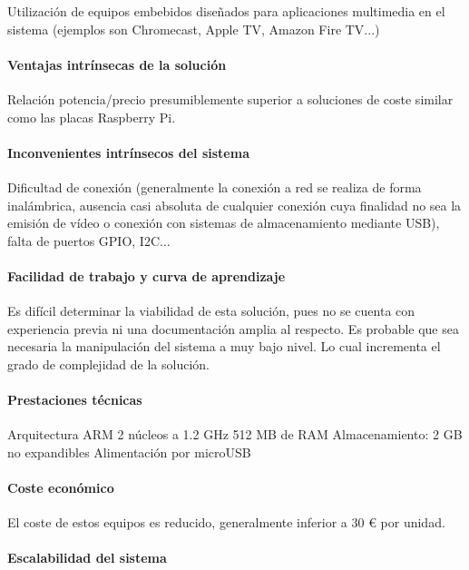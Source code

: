 Utilización de equipos embebidos diseñados para aplicaciones multimedia en el sistema (ejemplos son Chromecast, Apple TV, Amazon Fire TV...)

\paragraph{Ventajas intrínsecas de la solución}

Relación potencia/precio presumiblemente superior a soluciones de coste similar como las placas Raspberry Pi.

\paragraph{Inconvenientes intrínsecos del sistema}

Dificultad de conexión (generalmente la conexión a red se realiza de forma inalámbrica, ausencia casi absoluta de cualquier conexión cuya finalidad no sea la emisión de vídeo o conexión con sistemas de almacenamiento mediante USB), falta de puertos GPIO, I2C...

\paragraph{Facilidad de trabajo y curva de aprendizaje}
Es difícil determinar la viabilidad de esta solución, pues no se cuenta con experiencia previa ni una documentación amplia al respecto.
Es probable que sea necesaria la manipulación del sistema a muy bajo nivel. Lo cual incrementa el grado de complejidad de la solución.

\paragraph{Prestaciones técnicas}
Arquitectura ARM
2 núcleos a 1.2 GHz
512 MB de RAM
Almacenamiento: 2 GB no expandibles
Alimentación por microUSB

\paragraph{Coste económico}

El coste de estos equipos es reducido, generalmente inferior a 30 € por unidad.

\paragraph{Escalabilidad del sistema}

